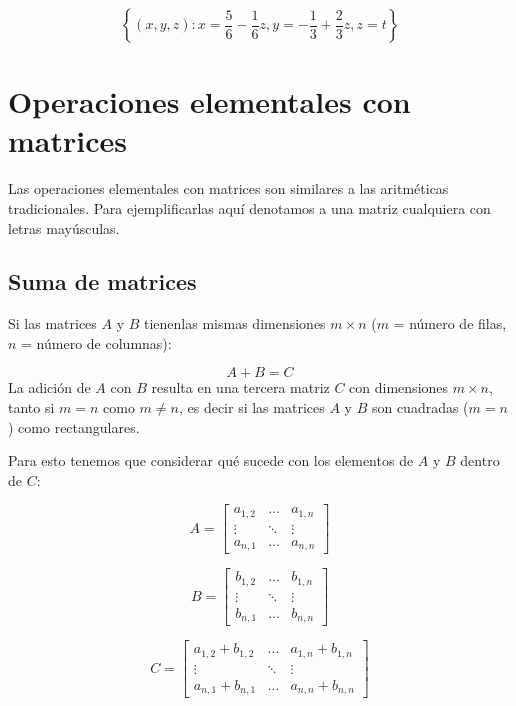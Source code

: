 \documentclass[
]{book}
\begin{document}
\[\left\{(x, y, z): x = \frac{5}{6} - \frac{1}{6}z, y = - \frac{1}{3} + \frac{2}{3}z, z = t \right\}\]

\hypertarget{operaciones-elementales-con-matrices}{%
\section{Operaciones elementales con matrices}\label{operaciones-elementales-con-matrices}}

Las operaciones elementales con matrices son similares a las aritméticas tradicionales. Para ejemplificarlas aquí denotamos a una matriz cualquiera con letras mayúsculas.

\hypertarget{suma-de-matrices}{%
\subsection{Suma de matrices}\label{suma-de-matrices}}

Si las matrices \(A\) y \(B\) tienenlas mismas dimensiones \(m \times n\) (\(m\) = número de filas, \(n\) = número de columnas):

\[A + B = C\]
La adición de \(A\) con \(B\) resulta en una tercera matriz \(C\) con dimensiones \(m \times n\), tanto si \(m = n\) como \(m \neq n\), es decir si las matrices \(A\) y \(B\) son cuadradas (\(m = n\)) como rectangulares.

Para esto tenemos que considerar qué sucede con los elementos de \(A\) y \(B\) dentro de \(C\):

\begin{equation}
A = \left[ 
\begin{array}{ccc}
a_{1, 2} & \dots & a_{1, n} \\
\vdots   & \ddots & \vdots \\
a_{n, 1} & \dots & a_{n, n}
\end{array} \right]
\end{equation}

\begin{equation}
B = \left[ 
\begin{array}{ccc}
b_{1, 2} & \dots & b_{1, n} \\
\vdots   & \ddots& \vdots \\
b_{n, 1} & \dots & b_{n, n}
\end{array} \right]
\end{equation}

\begin{equation}
C = \left[ 
\begin{array}{ccc}
a_{1, 2} + b_{1, 2} & \dots & a_{1, n} + b_{1, n} \\
\vdots   & \ddots & \vdots \\
a_{n, 1} + b_{n, 1} & \dots & a_{n, n} + b_{n, n}
\end{array} \right]
\end{equation}
\end{document}
